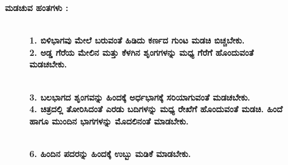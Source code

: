 \noindent
\textbf{ಮಡಚುವ ಹಂತಗಳು :}
\begin{figure}[H]
\\
\textbf{1. ಬಿಳಿಭಾಗವು ಮೇಲೆ ಬರುವಂತೆ ಹಿಡಿದು ಕರ್ಣದ ಗುಂಟ ಮಡಚಿ ಬಿಚ್ಚಬೇಕು.}\\
\textbf{2. ಅಡ್ಡ ಗೆರೆಯ ಮೇಲಿನ ಮತ್ತು ಕೆಳಗಿನ ಶೃಂಗಗಳನ್ನು ಮಧ್ಯ ಗೆರೆಗೆ ಹೊಂದುವಂತೆ ಮಡಚಬೇಕು.}
\end{figure}
\begin{figure}[H]
\\
\textbf{3. ಬಲಭಾಗದ ಶೃಂಗವನ್ನು ಹಿಂದಕ್ಕೆ ಅರ್ಧಭಾಗಕ್ಕೆ ಸರಿಯಾಗುವಂತೆ ಮಡಚಬೇಕು.}\\
\textbf{4. ಚಿತ್ರದಲ್ಲಿ ತೋರಿಸಿದಂತೆ ಎರಡು ಬದಿಗಳನ್ನು ಮಧ್ಯ ರೇಖೆಗೆ ಹೊಂದುವಂತೆ ಮಡಚಿ. ಹಿಂದೆ ಹಾಗೂ ಮುಂದಿನ ಭಾಗಗಳನ್ನು ಮೊದಲಿನಂತೆ ಮಾಡಬೇಕು.}
\end{figure}
\begin{figure}[H]
\\
\textbf{6. ಹಿಂದಿನ ಪದರನ್ನು ಹಿಂದಕ್ಕೆ ಉಬ್ಬು ಮಡಿಕೆ ಮಾಡಬೇಕು.}
\end{figure}
